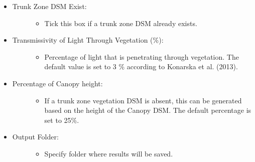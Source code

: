 \documentclass[letterpaper,10pt,english]{sphinxmanual}
\begin{document}
\begin{itemize}
\begin{description}
\begin{itemize}
\end{itemize}

\end{description}

\item {} \begin{description}
\item[{Trunk Zone DSM Exist:}] \leavevmode\begin{itemize}
\item {} 
Tick this box if a trunk zone DSM already exists.

\end{itemize}

\end{description}

\item {} \begin{description}
\item[{Transmissivity of Light Through Vegetation (\%):}] \leavevmode\begin{itemize}
\item {} 
Percentage of light that is penetrating through vegetation. The default value is set to 3 \% according to Konarska et al. (2013).

\end{itemize}

\end{description}

\item {} \begin{description}
\item[{Percentage of Canopy height:}] \leavevmode\begin{itemize}
\item {} 
If a trunk zone vegetation DSM is absent, this can be generated based on the height of the Canopy DSM. The default percentage is set to 25\%.

\end{itemize}

\end{description}

\item {} \begin{description}
\item[{Output Folder:}] \leavevmode\begin{itemize}
\item {} 
Specify folder where results will be saved.

\end{itemize}


\end{description}
\end{itemize}
\end{document}
